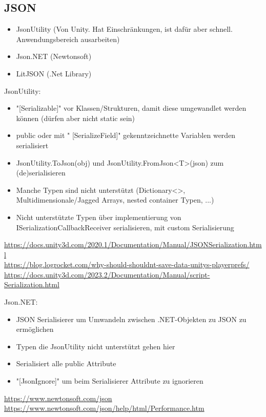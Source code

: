 \subsection{JSON}

\begin{itemize}
    \item JsonUtility (Von Unity. Hat Einschränkungen, ist dafür aber schnell. Anwendungsbereich ausarbeiten)
    \item Json.NET (Newtonsoft)
    \item LitJSON (.Net Library)
\end{itemize}

JsonUtility:
\begin{itemize}
    \item "[Serializable]" vor Klassen/Strukturen, damit diese umgewandlet werden können (dürfen aber nicht static sein)
    \item public oder mit " [SerializeField]" gekenntzeichnette Variablen werden serialisiert
    \item JsonUtility.ToJson(obj) und JsonUtility.FromJson<T>(json) zum (de)serialisieren
    \item Manche Typen sind nicht unterstützt (Dictionary<>, Multidimensionale/Jagged Arrays, nested container Typen, ...)
    \item Nicht unterstützte Typen über implementierung von ISerializationCallbackReceiver serialisieren, mit custom Serialisierung
\end{itemize}

\url{https://docs.unity3d.com/2020.1/Documentation/Manual/JSONSerialization.html}\\
\url{https://blog.logrocket.com/why-should-shouldnt-save-data-unitys-playerprefs/}\\
\url{https://docs.unity3d.com/2023.2/Documentation/Manual/script-Serialization.html}


Json.NET:
\begin{itemize}
    \item JSON Serialisierer um Umwandeln zwischen .NET-Objekten zu JSON zu ermöglichen 
    \item Typen die JsonUtility nicht unterstützt gehen hier
    \item Serialisiert alle public Attribute
    \item "[JsonIgnore]" um beim Serialisierer Attribute zu ignorieren
\end{itemize}

\url{https://www.newtonsoft.com/json}\\
\url{https://www.newtonsoft.com/json/help/html/Performance.htm}\\

